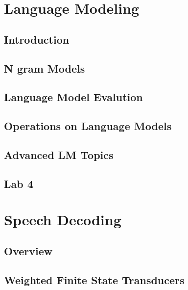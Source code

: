 \section{Language Modeling}
\subsection{Introduction} 

\subsection{N gram Models}

\subsection{Language Model Evalution}

\subsection{Operations on Language Models}

\subsection{Advanced LM Topics}

\subsection{Lab 4}

\section{Speech Decoding}
\subsection{Overview}

\subsection{Weighted Finite State Transducers}

